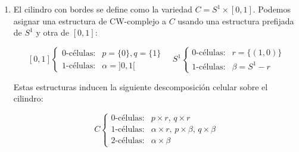 \begin{ejem}\label{CWlindro}
\begin{enumerate}
\item El cilindro con bordes se define como la variedad $C=S^1\times [0,1]$. Podemos asignar una estructura de CW-complejo a $C$ usando una estructura prefijada de $S^1$ y otra de $[0,1]$:

\[[0,1] \begin{cases}
\mbox{0-células:}&p=\{0\}, q=\{1\}\\
\mbox{1-células:}&\alpha=]0,1[
\end{cases} \quad
S^1 \begin{cases}
\mbox{0-células:}&r=\{(1,0)\}\\
\mbox{1-células:}&\beta=S^1-r
\end{cases}\]

Estas estructuras inducen la siguiente descomposición celular sobre el cilindro:

\[C \begin{cases}
\mbox{0-células:}&p\times r,\, q\times r\\
\mbox{1-células:}&\alpha \times r,\, p\times \beta,\, q\times \beta\\
\mbox{2-células:}&\alpha \times \beta
\end{cases}\]


\end{enumerate}
\end{ejem}
